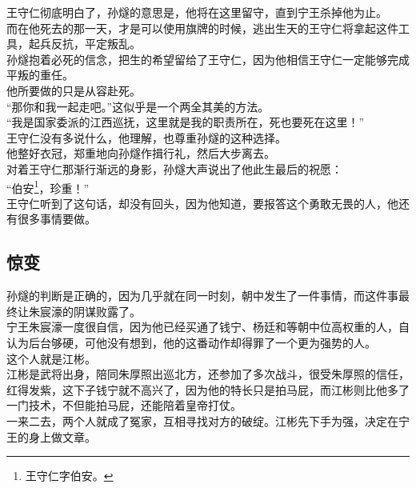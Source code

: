 \begin{multicols}{\theparacolNo}
王守仁彻底明白了，孙燧的意思是，他将在这里留守，直到宁王杀掉他为止。\\

而在他死去的那一天，才是可以使用旗牌的时候，逃出生天的王守仁将拿起这件工具，起兵反抗，平定叛乱。\\

孙燧抱着必死的信念，把生的希望留给了王守仁，因为他相信王守仁一定能够完成平叛的重任。\\

他所要做的只是从容赴死。\\

“那你和我一起走吧。”这似乎是一个两全其美的方法。\\

“我是国家委派的江西巡抚，这里就是我的职责所在，死也要死在这里！”\\

王守仁没有多说什么，他理解，也尊重孙燧的这种选择。\\

他整好衣冠，郑重地向孙燧作揖行礼，然后大步离去。\\

对着王守仁那渐行渐远的身影，孙燧大声说出了他此生最后的祝愿：\\

“伯安\footnote{王守仁字伯安。}，珍重！”\\

王守仁听到了这句话，却没有回头，因为他知道，要报答这个勇敢无畏的人，他还有很多事情要做。\\

\subsection{惊变}
孙燧的判断是正确的，因为几乎就在同一时刻，朝中发生了一件事情，而这件事最终让朱宸濠的阴谋败露了。\\

宁王朱宸濠一度很自信，因为他已经买通了钱宁、杨廷和等朝中位高权重的人，自认为后台够硬，可他没有想到，他的这番动作却得罪了一个更为强势的人。\\

这个人就是江彬。\\

江彬是武将出身，陪同朱厚照出巡北方，还参加了多次战斗，很受朱厚照的信任，红得发紫，这下子钱宁就不高兴了，因为他的特长只是拍马屁，而江彬则比他多了一门技术，不但能拍马屁，还能陪着皇帝打仗。\\

一来二去，两个人就成了冤家，互相寻找对方的破绽。江彬先下手为强，决定在宁王的身上做文章。\\


\end{multicols}
